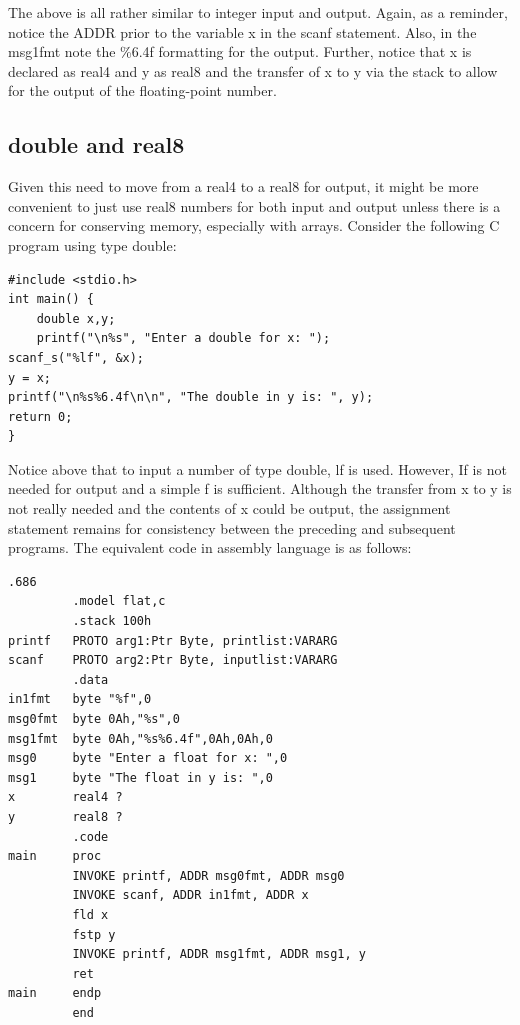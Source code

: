 \documentclass[10pt]{book}
\begin{document}
The above is all rather similar to integer input and output. Again, as a reminder, notice the ADDR prior to the variable x in the scanf statement. Also, in the msg1fmt note the \%6.4f formatting for the output. Further, notice that x is declared as real4 and y as real8 and the transfer of x to y via the stack to allow for the output of the floating-point number.
\subsection{double and real8}
Given this need to move from a real4 to a real8 for output, it might be more convenient to just use real8 numbers for both input and output unless there is a concern for conserving memory, especially with arrays. Consider the following C program using type double:

\begin{verbatim}
#include <stdio.h>
int main() {
    double x,y;
    printf("\n%s", "Enter a double for x: ");
scanf_s("%lf", &x);
y = x;
printf("\n%s%6.4f\n\n", "The double in y is: ", y);
return 0;
}
\end{verbatim}

Notice above that to input a number of type double, lf is used. However, If is not needed for output and a simple f is sufficient. Although the transfer from x to y is not really needed and the contents of x could be output, the assignment statement remains for consistency between the preceding and subsequent programs. The equivalent code in assembly language is as follows:

\begin{verbatim}
.686     
         .model flat,c 
         .stack 100h 
printf   PROTO arg1:Ptr Byte, printlist:VARARG 
scanf    PROTO arg2:Ptr Byte, inputlist:VARARG 
         .data 
in1fmt   byte "%f",0           
msg0fmt  byte 0Ah,"%s",0 
msg1fmt  byte 0Ah,"%s%6.4f",0Ah,0Ah,0 
msg0     byte "Enter a float for x: ",0 
msg1     byte "The float in y is: ",0 
x        real4 ? 
y        real8 ? 
         .code 
main     proc 
         INVOKE printf, ADDR msg0fmt, ADDR msg0 
         INVOKE scanf, ADDR in1fmt, ADDR x 
         fld x 
         fstp y 
         INVOKE printf, ADDR msg1fmt, ADDR msg1, y 
         ret 
main     endp 
         end  
\end{verbatim}
\end{document}
